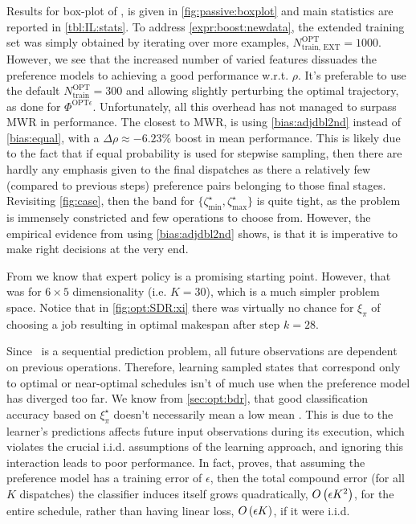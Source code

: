 \documentclass[smallextended]{svjour3}
\begin{document}
	Results for  box-plot of \namerho, is given in 
	\cref{fig:passive:boxplot} and main statistics are reported in 
	\cref{tbl:IL:stats}. 
	To address \ref{expr:boost:newdata}, the extended training set was simply 
	obtained by iterating over more examples, $N^{\text{OPT}}_{\text{train, 
			EXT}}=1000$. However, we see that the increased number of varied features 
	dissuades the preference models to achieving a good performance w.r.t. $\rho$. 
	It's preferable to use the default $N^{\text{OPT}}_{\text{train}}=300$ and 
	allowing slightly perturbing the optimal trajectory, as done for  
	$\Phi^{\text{OPT}\epsilon}$. Unfortunately, all this overhead has not managed 
	to surpass MWR in performance. 
	The closest to MWR, is using \ref{bias:adjdbl2nd} instead of \ref{bias:equal}, 
	with a $\Delta\rho\approx-6.23\%$ boost in mean performance. 
	This is likely due to the fact that if equal probability is used for stepwise 
	sampling, then there are hardly any emphasis given to the final dispatches as 
	there a relatively few (compared to previous steps) preference pairs belonging 
	to those final stages.
	Revisiting \cref{fig:case}, then the band for 
	$\{\zeta^{\star}_{\min},\zeta^{\star}_{\max}\}$ is quite tight, as the problem 
	is immensely constricted and few operations to choose from. However, the 
	empirical evidence from using \ref{bias:adjdbl2nd} shows, is that it is 
	imperative to make right decisions at the very end.
	
	From \cite{InRu11a} we know that expert policy is a promising starting point.
	However, that was for $6\times5$ dimensionality (i.e. $K=30$), which is a much 
	simpler problem space. Notice that in \cref{fig:opt:SDR:xi} there was 
	virtually no chance for $\xi_\pi$ of choosing a job resulting in optimal 
	makespan after step $k=28$.
	
	Since \jsp\ is a sequential prediction problem, all future observations are 
	dependent on previous operations. 
	Therefore, learning sampled states that correspond only to optimal or 
	near-optimal schedules isn't of much use when the preference model has 
	diverged too far. We know from \cref{sec:opt:bdr}, that good classification 
	accuracy based on $\xi^\star_\pi$ doesn't necessarily mean a low mean \namerho.
	This is due to the learner's predictions affects future input observations 
	during its execution, which violates the crucial i.i.d. assumptions of the  
	learning approach, and ignoring this interaction leads to poor performance.
	In fact, \cite{RossB10} proves, that assuming the preference model has a 
	training error of $\epsilon$, then the total compound error (for all $K$ 
	dispatches) the classifier induces itself grows quadratically, ${O}\left(\epsilon 
		K^2\right)$, for the entire schedule, rather than having linear loss, 
	${O}\left(\epsilon K\right)$, if it were i.i.d.
	
\end{document}
